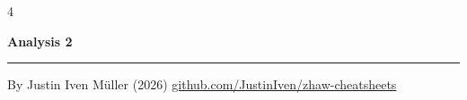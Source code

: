 \documentclass[10pt,landscape]{article}
\begin{document}

\begin{multicols*}{4}

    \begin{center}
        \Large{\textbf{Analysis 2}} \\
    \end{center}

    
    
    
    
    

    \vfill

    \rule{0.3\linewidth}{0.25pt}
    \scriptsize

    By Justin Iven Müller (2026)
    \href{https://github.com/JustinIven/zhaw-cheatsheets}{github.com/JustinIven/zhaw-cheatsheets}


\end{multicols*}
\end{document}
